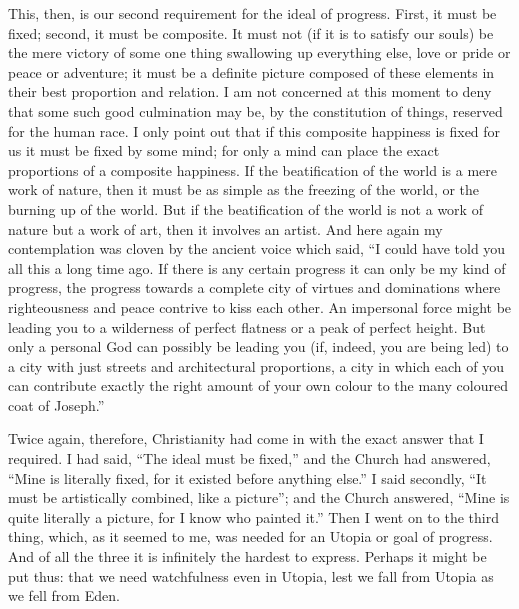 This, then, is our second requirement for the ideal of progress. First, it must be fixed; second, it must be composite. It must not (if it is to satisfy our souls) be the mere victory of some one thing swallowing up everything else, love or pride or peace or adventure; it must be a definite picture composed of these elements in their best proportion and relation. I am not concerned at this moment to deny that some such good culmination may be, by the constitution of things, reserved for the human race. I only point out that if this composite happiness is fixed for us it must be fixed by some mind; for only a mind can place the exact proportions of a composite happiness. If the beatification of the world is a mere work of nature, then it must be as simple as the freezing of the world, or the burning up of the world. But if the beatification of the world is not a work of nature but a work of art, then it involves an artist. And here again my contemplation was cloven by the ancient voice which said, “I could have told you all this a long time ago. If there is any certain progress it can only be my kind of progress, the progress towards a complete city of virtues and dominations where righteousness and peace contrive to kiss each other. An impersonal force might be leading you to a wilderness of perfect flatness or a peak of perfect height. But only a personal God can possibly be leading you (if, indeed, you are being led) to a city with just streets and architectural proportions, a city in which each of you can contribute exactly the right amount of your own colour to the many coloured coat of Joseph.”

Twice again, therefore, Christianity had come in with the exact answer that I required. I had said, “The ideal must be fixed,” and the Church had answered, “Mine is literally fixed, for it existed before anything else.” I said secondly, “It must be artistically combined, like a picture”; and the Church answered, “Mine is quite literally a picture, for I know who painted it.” Then I went on to the third thing, which, as it seemed to me, was needed for an Utopia or goal of progress. And of all the three it is infinitely the hardest to express. Perhaps it might be put thus: that we need watchfulness even in Utopia, lest we fall from Utopia as we fell from Eden.

